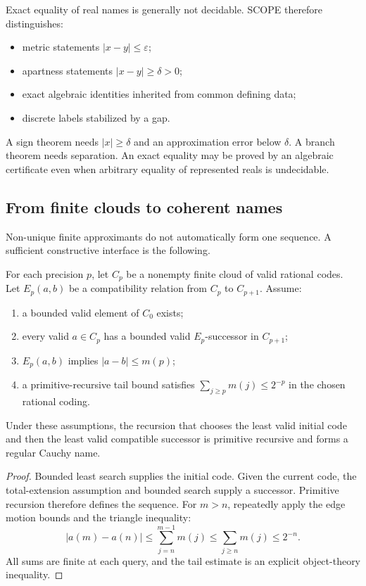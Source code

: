 Exact equality of real names is generally not decidable.  SCOPE therefore distinguishes:

\begin{itemize}
\item metric statements \(|x-y|\le\varepsilon\);
\item apartness statements \(|x-y|\ge\delta>0\);
\item exact algebraic identities inherited from common defining data;
\item discrete labels stabilized by a gap.
\end{itemize}

A sign theorem needs \(|x|\ge\delta\) and an approximation error below \(\delta\).  A branch theorem needs separation.  An exact equality may be proved by an algebraic certificate even when arbitrary equality of represented reals is undecidable.

\subsection{From finite clouds to coherent names}

Non-unique finite approximants do not automatically form one sequence.  A sufficient constructive interface is the following.

For each precision \(p\), let \(C_p\) be a nonempty finite cloud of valid rational codes.  Let \(E_p(a,b)\) be a compatibility relation from \(C_p\) to \(C_{p+1}\).  Assume:

\begin{enumerate}
\item a bounded valid element of \(C_0\) exists;
\item every valid \(a\in C_p\) has a bounded valid \(E_p\)-successor in \(C_{p+1}\);
\item \(E_p(a,b)\) implies \(|a-b|\le m(p)\);
\item a primitive-recursive tail bound satisfies \(\sum_{j\ge p}m(j)\le 2^{-p}\) in the chosen rational coding.
\end{enumerate}

\begin{theorem}
Under these assumptions, the recursion that chooses the least valid initial code and then the least valid compatible successor is primitive recursive and forms a regular Cauchy name.
\end{theorem}
\begin{proof}
Bounded least search supplies the initial code.  Given the current code, the total-extension assumption and bounded search supply a successor.  Primitive recursion therefore defines the sequence.  For \(m>n\), repeatedly apply the edge motion bounds and the triangle inequality:
\[
  |a(m)-a(n)|\le\sum_{j=n}^{m-1}m(j)\le\sum_{j\ge n}m(j)\le2^{-n}.
\]
All sums are finite at each query, and the tail estimate is an explicit object-theory inequality.
\end{proof}

